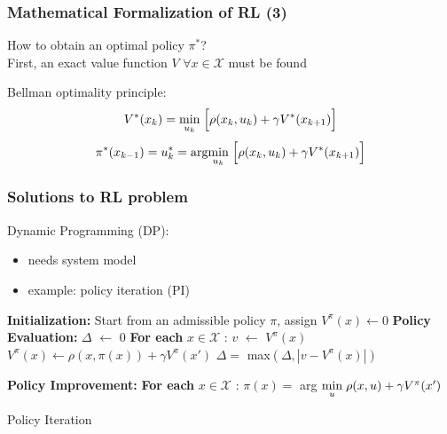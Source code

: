 \documentclass{beamer}
\begin{document}
	\begin{frame}\frametitle{Mathematical Formalization of RL (3)}
		How to obtain an optimal policy $ \pi^* $? \\
		First, an exact value function $ V$ $ \forall x \in \mathcal{X} $ must be found
		\begin{definition}
			Bellman optimality principle:
			\begin{equation}
			V^*(x_{k}) = \underset{u_k}{\text{min}} \hspace{1mm} \Big[ \rho(x_k,u_k) + \gamma V^*(x_{k+1}) \Big] 			
			\end{equation}
			\begin{equation}
			\pi^*(x_{k-1}) = u^*_k = \text{arg} \underset{u_k}{\text{min}} \hspace{1mm} \Big[ \rho(x_k,u_k) + \gamma V^*(x_{k+1}) \Big] 				
			\end{equation}		
		\end{definition}
	\end{frame}
	
	\begin{frame}\frametitle{Solutions to RL problem}
		\vspace{2mm}
		\fontsize{8}{4}\selectfont 
	 	Dynamic Programming (DP):
	 	\begin{itemize}
	 		\item needs system model
	 		\item example: policy iteration (PI)
	 	\end{itemize}
		\pause
		\begin{algorithm}[H]
			\begin{algorithmic}[1]    			
				\fontsize{8}{4}\selectfont 
				\STATE \textbf{Initialization:} 
				\STATE \hspace{2mm} Start from an admissible policy $ \pi$, assign $ V^{\pi}(x) \leftarrow 0$  
				\REPEAT    			
				\STATE \textbf{Policy Evaluation:} 
				\REPEAT 	    			    
				\STATE 	$ \Delta $ $ \leftarrow $ 0 
				\STATE 	\textbf{For each} $ x \in \mathcal{X} $ :
				\STATE 	\hspace{5mm} $ v $ $ \leftarrow $ $ V^{\pi}(x) $ 
				\STATE 	\hspace{5mm} $ V^{\pi}(x) \leftarrow \rho(x, \pi(x)) +\gamma V^{\pi}(x') $ 
				\STATE 	\hspace{5mm} $ \Delta = $ max$ (\Delta, |v-V^{\pi}(x)|) $
				
				\STATE \textbf{Policy Improvement:} 
				\STATE \textbf{For each} $ x \in \mathcal{X} $ : 
				\STATE \hspace{5mm} $ \pi(x)=$  arg $\underset{u}{\text{min}} \hspace{1mm} \rho(x, u) +\gamma V^{\pi}(x') $  
			\end{algorithmic}
			\caption{Policy Iteration}
		\end{algorithm}
	\end{frame}
							
\end{document}
